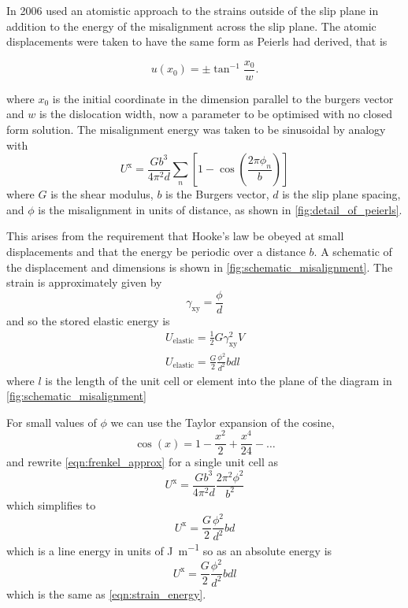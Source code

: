 In 2006 \citet{Clegg2006} used an atomistic approach to the strains outside of the slip plane in addition to the energy of the misalignment across the slip plane. The atomic displacements were taken to have the same form as Peierls had derived, that is

\begin{equation}
u(x_0) = \pm \tan^{-1}\frac{x_0}{w}.
\end{equation}

where $x_0$ is the initial coordinate in the dimension parallel to the burgers vector and $w$ is the dislocation width, now a parameter to be optimised with no closed form solution. The misalignment energy was taken to be sinusoidal by analogy with \citet{Frenkel1926}
\begin{equation}
U^{\text{x}} = \frac{Gb^3}{4\pi^2 d} \sum_n \left[ 1 - \cos \left(\frac{2\pi \phi_n}{b} \right)\right] \label{eqn:frenkel_approx}
\end{equation}
where $G$ is the shear modulus, $b$ is the Burgers vector, $d$ is the slip plane spacing, and $\phi$ is the misalignment in units of distance, as shown in \autoref{fig:detail_of_peierls}.



This arises from the requirement that Hooke's law be obeyed at small displacements and that the energy be periodic over a distance $b$. A schematic of the displacement and dimensions is shown in \autoref{fig:schematic_misalignment}.
The strain is approximately given by 
\begin{equation}
\gamma_{\text{xy}} = \frac{\phi}{d}
\end{equation}
and so the stored elastic energy is 
\begin{align}
U_{\text{elastic}} = \frac{1}{2} G \gamma_{\text{xy}}^2 V \nonumber\\
U_{\text{elastic}} = \frac{G}{2} \frac{\phi^2}{d^2} b d l \label{eqn:strain_energy}
\end{align}
where $l$ is the length of the unit cell or element into the plane of the diagram in \autoref{fig:schematic_misalignment}

For small values of $\phi$ we can use the Taylor expansion of the cosine,
\begin{equation}
\cos(x) = 1 - \frac{x^2}{2} + \frac{x^4}{24} - \dots
\end{equation}
and rewrite \autoref{eqn:frenkel_approx} for a single unit cell as
\begin{equation}
U^{\text{x}} = \frac{Gb^3}{4\pi^2 d} \frac{2 \pi^2 \phi^2}{b^2}
\end{equation}
which simplifies to 
\begin{equation}
U^{\text{x}} = \frac{G}{2} \frac{\phi^2}{d^2} b d
\end{equation}
which is a line energy in units of \si{\joule\per\meter} so as an absolute energy is
\begin{equation}
U^{\text{x}} = \frac{G}{2} \frac{\phi^2}{d^2} b d l
\end{equation}
which is the same as \autoref{eqn:strain_energy}.









